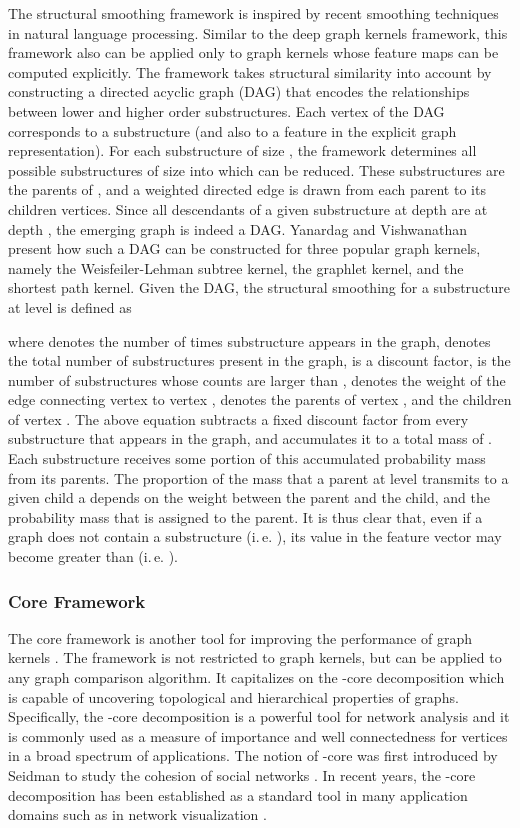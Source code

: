 \documentclass[twoside,11pt]{article}
\newcommand{\ie}{i.\,e. }
\begin{document}
The structural smoothing framework is inspired by recent smoothing techniques in natural language processing.
Similar to the deep graph kernels framework, this framework also can be applied only to graph kernels whose feature maps  can be computed explicitly.
The framework takes structural similarity into account by constructing a directed acyclic graph (DAG) that encodes the relationships between lower and higher order substructures.
Each vertex of the DAG corresponds to a substructure (and also to a feature in the explicit graph representation).
For each substructure  of size , the framework determines all possible substructures of size  into which  can be reduced.
These substructures are the parents of , and a weighted directed edge is drawn from each parent to its children vertices.
Since all descendants of a given substructure at depth  are at depth , the emerging graph is indeed a DAG.
Yanardag and Vishwanathan \citeyear{yanardag2015deep} present how such a DAG can be constructed for three popular graph kernels, namely the Weisfeiler-Lehman subtree kernel, the graphlet kernel, and the shortest path kernel.
Given the DAG, the structural smoothing for a substructure  at level  is defined as

where  denotes the number of times substructure  appears in the graph,  denotes the total number of substructures present in the graph,  is a discount factor,  is the number of substructures whose counts are larger than ,  denotes the weight of the edge connecting vertex  to vertex ,  denotes the parents of vertex , and  the children of vertex .
The above equation subtracts a fixed discount factor  from every substructure that appears in the graph, and accumulates it to a total mass of .
Each substructure  receives some portion of this accumulated probability mass from its parents.
The proportion of the mass that a parent  at level  transmits to a given child a depends on the weight  between the parent and the child, and the probability mass  that is assigned to the parent.
It is thus clear that, even if a graph does not contain a substructure  (\ie ), its value in the feature vector may become greater than  (\ie ).

\subsubsection{Core Framework}
The core framework is another tool for improving the performance of graph kernels \cite{nikolentzos2018}.
The framework is not restricted to graph kernels, but can be applied to any graph comparison algorithm.
It capitalizes on the -core decomposition which is capable of uncovering topological and hierarchical properties of graphs.
Specifically, the -core decomposition is a powerful tool for network analysis and it is commonly used as a measure of importance and well connectedness for vertices in a broad spectrum of applications.
The notion of -core was first introduced by Seidman to study the cohesion of social networks \cite{seidman1983network}.
In recent years, the -core decomposition has been established as a standard tool in many application domains such as in network visualization \cite{alvarez2006large}.
\end{document}
